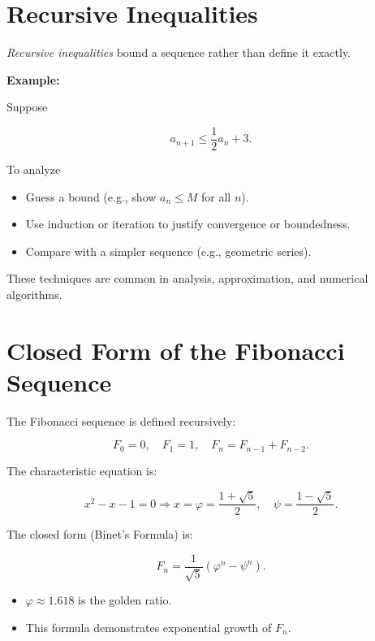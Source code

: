 \section{Recursive Inequalities}

\emph{Recursive inequalities} bound a sequence rather than define it exactly.

\textbf{Example:}

Suppose

\[
    a_{n+1} \le \frac{1}{2} a_n + 3.
\]

To analyze

\begin{itemize}

    \item Guess a bound (e.g., show \( a_n \le M \) for all \(n\)).
    \item Use induction or iteration to justify convergence or boundedness.
    \item Compare with a simpler sequence (e.g., geometric series).

\end{itemize}

These techniques are common in analysis, approximation, and numerical algorithms.

\section{Closed Form of the Fibonacci Sequence}

The Fibonacci sequence is defined recursively:

\[
    F_0 = 0, \quad F_1 = 1, \quad F_n = F_{n-1} + F_{n-2}.
\]

The characteristic equation is:

\[
    x^2 - x - 1 = 0 \Rightarrow x = \varphi = \frac{1 + \sqrt{5}}{2}, \quad \psi = \frac{1 - \sqrt{5}}{2}.
\]

The closed form (Binet’s Formula) is:

\[
    F_n = \frac{1}{\sqrt{5}} \left( \varphi^n - \psi^n \right).
\]

\begin{itemize}
    
    \item \( \varphi \approx 1.618 \) is the golden ratio.
    
    \item This formula demonstrates exponential growth of \( F_n \).

\end{itemize}

